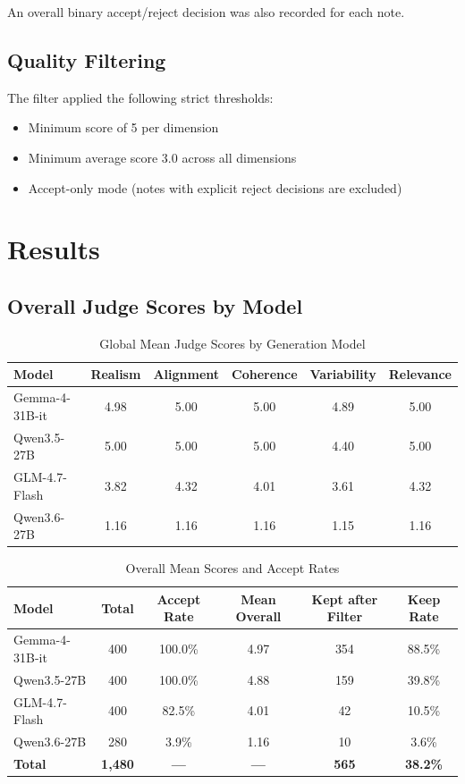 \documentclass[11pt, a4paper]{article}
\begin{document}
An overall binary accept/reject decision was also recorded for each note.

\subsection{Quality Filtering}

The filter applied the following strict thresholds:

\begin{itemize}
    \item Minimum score of 5 per dimension
    \item Minimum average score \textbar{} 3.0 across all dimensions
    \item Accept-only mode (notes with explicit reject decisions are excluded)
\end{itemize}

\section{Results}

\subsection{Overall Judge Scores by Model}

\begin{table}[H]
\centering
\caption{Global Mean Judge Scores by Generation Model}
\label{tab:judge_scores}
\begin{tabular}{lccccc}
\toprule
\textbf{Model} & \textbf{Realism} & \textbf{Alignment} & \textbf{Coherence} & \textbf{Variability} & \textbf{Relevance} \\
\midrule
Gemma-4-31B-it & 4.98 & 5.00 & 5.00 & 4.89 & 5.00 \\
Qwen3.5-27B & 5.00 & 5.00 & 5.00 & 4.40 & 5.00 \\
GLM-4.7-Flash & 3.82 & 4.32 & 4.01 & 3.61 & 4.32 \\
Qwen3.6-27B & 1.16 & 1.16 & 1.16 & 1.15 & 1.16 \\
\bottomrule
\end{tabular}
\end{table}

\begin{table}[H]
\centering
\caption{Overall Mean Scores and Accept Rates}
\label{tab:overall_scores}
\begin{tabular}{lccccc}
\toprule
\textbf{Model} & \textbf{Total} & \textbf{Accept Rate} & \textbf{Mean Overall} & \textbf{Kept after Filter} & \textbf{Keep Rate} \\
\midrule
Gemma-4-31B-it & 400 & 100.0\% & 4.97 & 354 & 88.5\% \\
Qwen3.5-27B & 400 & 100.0\% & 4.88 & 159 & 39.8\% \\
GLM-4.7-Flash & 400 & 82.5\% & 4.01 & 42 & 10.5\% \\
Qwen3.6-27B & 280 & 3.9\% & 1.16 & 10 & 3.6\% \\
\midrule
\textbf{Total} & \textbf{1,480} & \textbf{---} & \textbf{---} & \textbf{565} & \textbf{38.2\%} \\
\bottomrule
\end{tabular}
\end{table}
\end{document}
